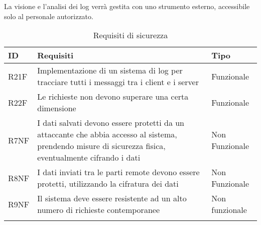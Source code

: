 La visione e l'analisi dei log verrà gestita con uno strumento esterno, 
accessibile solo al personale autorizzato.


\begin{longtable}{|P{1.3cm}|P{11.2cm}|P{3cm}|}
        \hline
        \textbf{ID}             & \textbf{Requisiti}                                                                           & \textbf{Tipo}  \\
        \hline
        \endhead
        R21F                    & Implementazione di un sistema di log per tracciare tutti i messaggi
        tra i client e i server & Funzionale                                                                                                    \\
        \hline
        R22F                    & Le richieste non devono superare una certa dimensione                                        & Funzionale     \\
        \hline
        R7NF                    & I dati salvati devono essere protetti da un attaccante che abbia
        accesso al sistema, prendendo misure di sicurezza fisica, eventualmente
        cifrando i dati         & Non Funzionale                                                                                                \\
        \hline
        R8NF                    & I dati inviati tra le parti remote devono essere protetti, utilizzando la cifratura dei dati & Non Funzionale \\
        \hline
        R9NF                    & Il sistema deve essere resistente ad un alto numero di richieste contemporanee               & Non funzionale \\
        \hline
    \caption{Requisiti di sicurezza}
\end{longtable}

\clearpage